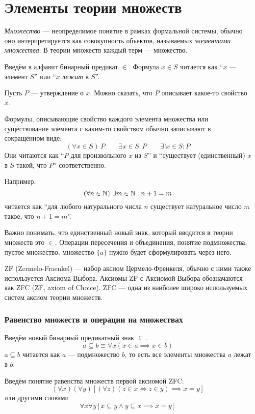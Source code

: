 \part{Элементы теории множеств}

{\it Множество} --- неопределимое понятие в рамках формальной системы,
обычно оно интерпретируется как совокупность объектов,
называемых {\it элементами множества}.
В теории множеств каждый терм --- множество.

Введём в алфавит бинарный предикат $\in$. Формула ${x\in S}$ читается
как ``$x$ --- элемент $S$'' или ``$x$ {\it лежит} в $S$''.

Пусть $P$ --- утверждение о $x$. Можно сказать, что $P$ описывает какое-то
свойство $x$.

Формулы, описывающие свойство каждого элемента множества или
существование элемента с каким-то свойством обычно записывают в сокращённом виде:
\[
	(\forall x\in S)~P\qquad \exists x\in S:P\qquad \exists!x\in S:P
\]
Они читаются как ``$P$ для произвольного $x$ из $S$'' и
``существует (единственный) $x$ в $S$ такой, что $P$'' соответственно.

Например,
\[
	(\forall n\in\mathbb N)~\exists m\in\mathbb N:n+1=m
\]
читается как ``для любого натурального числа $n$ существует натуральное число
$m$ такое, что $n+1=m$''.

Важно понимать, что единственный новый знак, который вводится в теории множеств
это $\in$. Операции пересечения и объединения, понятие подмножества, пустое множество,
множество $\{a\}$ нужно будет сформулировать через него.

ZF (Zermelo-Fraenkel) --- набор аксиом Цермело-Френкеля, обычно с ними также
используется Аксиома Выбора. Аксиомы ZF с Аксиомой Выбора
обозначаются как ZFC (ZF, axiom of Choice).
ZFC --- одна из наиболее широко используемых систем аксиом теории множеств.

\section{Равенство множеств и операции на множествах}

Введём новый бинарный предикатный знак $\subseteq$.
\[
	a\subseteq b\equiv \forall x(x\in a\implies x\in b)
\]
${a\subseteq b}$ читается как $a$ --- подмножество $b$, то есть все
элементы множества $a$ лежат в $b$.

Введём понятие равенства множеств первой аксиомой ZFC:
\[
	(\forall x)(\forall y)[(\forall z)(z\in x\iff z\in y)\implies x=y]
\]
или другими словами
\[
	\forall x\forall y[x\subseteq y\land y\subseteq x\implies x=y]
\]

